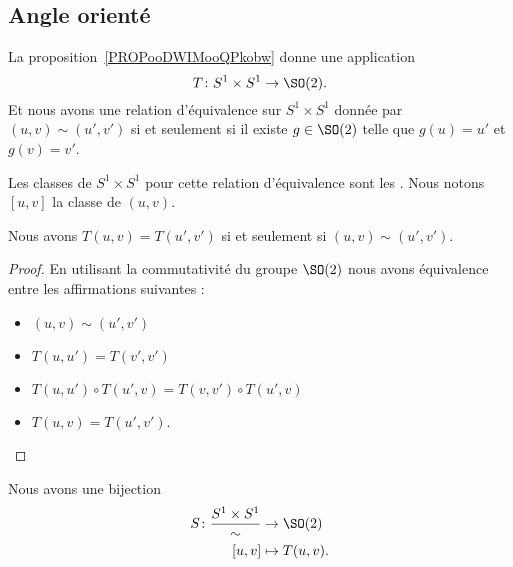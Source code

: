 \subsection{Angle orienté}

La proposition~\ref{PROPooDWIMooQPkobw} donne une application
\begin{equation}
    T\colon S^1\times S^1\to \SO(2).
\end{equation}
Et nous avons une relation d'équivalence sur \( S^1\times S^1\) donnée par \( (u,v)\sim(u',v')\) si et seulement si il existe \( g\in\SO(2)\) telle que \( g(u)=u'\) et \( g(v)=v'\).

\begin{definition}      \label{DEFooVBKIooWlHvod}
    Les classes de \( S^1\times S^1\) pour cette relation d'équivalence sont les . Nous notons \( [u,v]\) la classe de \( (u,v)\).
\end{definition}

\begin{proposition}     \label{PROPooIWJQooGQJBWR}
    Nous avons \( T(u,v)=T(u',v')\) si et seulement si \( (u,v)\sim(u',v')\).
\end{proposition}

\begin{proof}
    En utilisant la commutativité du groupe \( \SO(2)\) nous avons équivalence entre les affirmations suivantes :
    \begin{itemize}
        \item \( (u,v)\sim (u',v')\)
        \item \( T(u,u')=T(v',v')\)
        \item \( T(u,u')\circ T(u',v)=T(v,v')\circ T(u',v)\)
        \item
            \( T(u,v)=T(u',v')\).
    \end{itemize}
\end{proof}

\begin{proposition}
    Nous avons une bijection
    \begin{equation}
        \begin{aligned}
            S\colon \frac{ S^1\times S^1 }{ \sim }&\to \SO(2) \\
            [u,v]&\mapsto T(u,v).
        \end{aligned}
    \end{equation}
\end{proposition}

